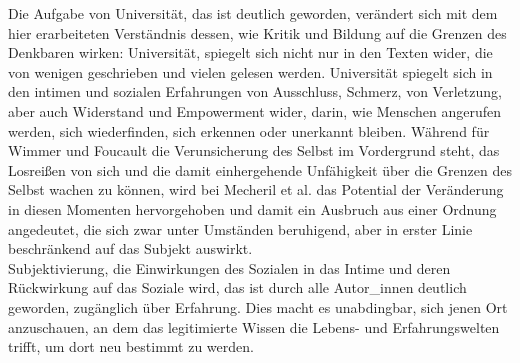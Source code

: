 \noindent Die Aufgabe von Universität, das ist deutlich geworden, verändert sich mit dem
hier erarbeiteten Verständnis dessen, wie Kritik und Bildung auf die Grenzen
des Denkbaren wirken: Universität, spiegelt sich nicht nur in den Texten wider,
die von wenigen geschrieben und vielen gelesen werden. Universität spiegelt
sich in den intimen und sozialen Erfahrungen von Ausschluss, Schmerz, von
Verletzung, aber auch Widerstand und Empowerment wider, darin, wie Menschen
angerufen werden, sich wiederfinden, sich erkennen oder unerkannt bleiben.
Während für Wimmer und Foucault die Verunsicherung des Selbst im Vordergrund
steht, das Losreißen von sich und die damit einhergehende Unfähigkeit über die
Grenzen des Selbst wachen zu können, wird bei Mecheril et al. das Potential der
Veränderung in diesen Momenten hervorgehoben und damit ein Ausbruch aus einer
Ordnung angedeutet, die sich zwar unter Umständen beruhigend, aber in erster
Linie beschränkend auf das Subjekt auswirkt.\\ 

\noindent Subjektivierung, die Einwirkungen
des Sozialen in das Intime und deren Rückwirkung auf das Soziale wird, das ist
durch alle Autor\_innen deutlich geworden, zugänglich über Erfahrung. Dies macht
es unabdingbar, sich jenen Ort anzuschauen, an dem das legitimierte Wissen die
Lebens- und Erfahrungswelten trifft, um dort neu bestimmt zu werden.
